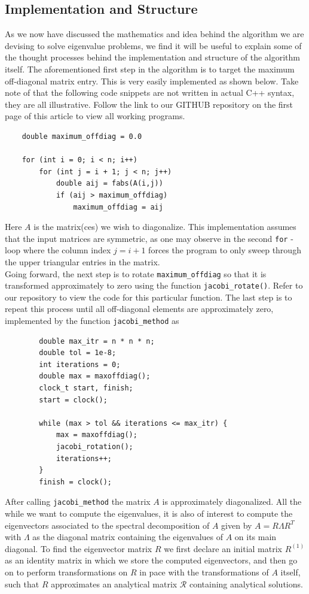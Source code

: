  	\subsection{Implementation and Structure}
 	As we now have discussed the mathematics and idea behind the algorithm we are devising to solve eigenvalue problems, we find it will be useful to explain some of the thought processes behind the implementation and structure of the algorithm itself. The aforementioned first step in the algorithm is to target the maximum off-diagonal matrix entry. This is very easily implemented as shown below. Take note of that the following code snippets are not written in actual C++ syntax, they are all illustrative. Follow the link to our GITHUB repository on the first page of this article to view all working programs.
 	\newpage
 	\begin{lstlisting}
 	double maximum_offdiag = 0.0
 		
 	for (int i = 0; i < n; i++)
 		for (int j = i + 1; j < n; j++)
 			double aij = fabs(A(i,j))
 			if (aij > maximum_offdiag)
 				maximum_offdiag = aij
 	\end{lstlisting}
 	Here $A$ is the matrix(ces) we wish to diagonalize. This implementation assumes that the input matrices are symmetric, as one may observe in the second \texttt{for} - loop where the column index $j = i + 1$ forces the program to only sweep through the upper triangular entries in the matrix.\\
 	
 	Going forward, the next step is to rotate \texttt{maximum\_offdiag} so that it is transformed approximately to zero using the function \texttt{jacobi\_rotate()}. Refer to our repository to view the code for this particular function. The last step is to repeat this process until all off-diagonal elements are approximately zero, implemented by the function \texttt{jacobi\_method} as
 	\begin{lstlisting}
 		double max_itr = n * n * n;
 		double tol = 1e-8;
 		int iterations = 0;
 		double max = maxoffdiag();
 		clock_t start, finish;
 		start = clock();
 		
 		while (max > tol && iterations <= max_itr) {
 			max = maxoffdiag();
 			jacobi_rotation();
 			iterations++;
 		}
 		finish = clock();
 	\end{lstlisting}
 	After calling \texttt{jacobi\_method} the matrix $A$ is approximately diagonalized. All the while we want to compute the eigenvalues, it is also of interest to compute the eigenvectors associated to the spectral decomposition of $A$ given by $A = R\Lambda R^T$ with $\Lambda$ as the diagonal matrix containing the eigenvalues of $A$ on its main diagonal. To find the eigenvector matrix $R$ we first declare an initial matrix $R^{(1)}$ as an identity matrix in which we store the computed eigenvectors, and then go on to perform transformations on $R$ in pace with the transformations of $A$ itself, such that $R$ approximates an analytical matrix $\mathcal{R}$ containing analytical solutions. 
